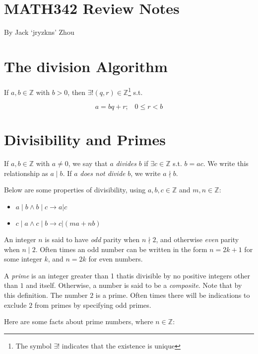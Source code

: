 \documentclass{article}
\begin{document}
\begin{multicols*}{2}

\section*{MATH342 Review Notes}

By Jack `jryzkns' Zhou

\section{The division Algorithm}

If $a, b \in \mathbb{Z}$ with $b > 0$, then $\exists ! (q, r) \in \mathbb{Z}$\footnote{The symbol $\exists!$ indicates that the existence is unique} s.t.

\[ a = bq + r; \;\;\; 0 \leq r < b \]

\section{Divisibility and Primes}

If $a, b \in \mathbb{Z}$ with $a \neq 0$, we say that $a$ \textit{divides} $b$ if $\exists c \in \mathbb{Z}$ s.t. $b = ac$. We write this relationship as $ a \mid b$. If $a$ \textit{does not divide} $b$, we write $a \nmid b$.

Below are some properties of divisibility, using $a,b,c \in \mathbb{Z}$ and $m,n \in \mathbb{Z}$:

\begin{itemize}
\item $a \mid b \wedge b \mid c \rightarrow a | c$
\item $c \mid a \wedge c \mid b \rightarrow c | (ma + nb)$
\end{itemize}

An integer $n$ is said to have \textit{odd} parity when $n \nmid 2$, and otherwise \textit{even} parity when $n \mid 2$. Often times an odd number can be written in the form $n = 2k + 1$ for some integer $k$, and $n = 2k$ for even numbers.

A \textit{prime} is an integer greater than 1 thatis divisible by no positive integers other than $1$ and itself. Otherwise, a number is said to be a \textit{composite}. Note that by this definition. The number $2$ is a prime. Often times there will be indications to exclude $2$ from primes by specifying odd primes.

Here are some facts about prime numbers, where $n \in \mathbb{Z}$:


\end{multicols*}
\end{document}
